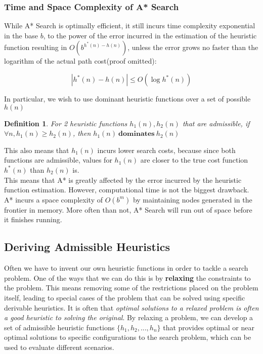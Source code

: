 \documentclass[12pt]{article}
\newtheorem{definition}{Definition}
\begin{document}
\subsubsection{Time and Space Complexity of A* Search}

While A* Search is optimally efficient, it still incurs time complexity exponential in the base $b$, to the power of the error incurred in the estimation of the heuristic function resulting in $O(b^{h^*(n) - h(n)})$, unless the error grows no faster than the logarithm of the actual path cost(proof omitted):

\begin{equation*}
|h^*(n) - h(n)| \leq O(\log h^*(n))
\end{equation*}

In particular, we wish to use dominant heuristic functions over a set of possible $h(n)$

\begin{definition}
For 2 heuristic functions $h_1(n), h_2(n)$ that are admissible, if $\forall n, h_1(n) \geq h_2(n)$, then $h_1(n)\ \textbf{dominates}\ h_2(n)$
\end{definition}

This also means that $h_1(n)$ incurs lower search costs, because since both functions are admissible, values for $h_1(n)$ are closer to the true cost function $h^*(n)$ than $h_2(n)$ is.\\

This means that A* is greatly affected by the error incurred by the heuristic function estimation. However, computational time is not the biggest drawback. A* incurs a space complexity of $O(b^m)$ by maintaining nodes generated in the frontier in memory. More often than not, A* Search will run out of space before it finishes running.

\subsection{Deriving Admissible Heuristics}

Often we have to invent our own heuristic functions in order to tackle a search problem. One of the ways that we can do this is by \textbf{relaxing} the constraints to the problem. This means removing some of the restrictions placed on the problem itself, leading to special cases of the problem that can be solved using specific derivable heuristics. It is often that \textit{optimal solutions to a relaxed problem is often a good heuristic to solving the original}. By relaxing a problem, we can develop a set of admissible heuristic functions $\{h_1, h_2,..., h_n\}$ that provides optimal or near optimal solutions to specific configurations to the search problem, which can be used to evaluate different scenarios.\\
\end{document}
